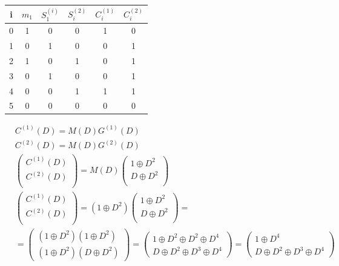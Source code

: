 \documentclass[12pt]{article}
\begin{document}
    \begin{table}[h]
       \centering 
        \begin{tabular}{cccccc}
            i & $m_1$ & $S_1^{(i)}$ & $S_i^{(2)}$ & $C_i^{(1)}$ & $C_i^{(2)}$  \\ \hline
            0 &  1    &  0          &   0         &  1          &  0  \\        
            1 &  0    &  1          &   0         &  0          &  1  \\  
            2 &  1    &  0          &   1         &  0          &  1  \\  
            3 &  0    &  1          &   0         &  0          &  1  \\  
            4 &  0    &  0          &   1         &  1          &  1  \\  
            5 &  0    &  0          &   0         &  0          &  0  \\   
        \end{tabular}
    \end{table}

    \begin{align*}
        & C^{(1)}(D) = M(D)G^{(1)}(D) \\ 
        & C^{(2)}(D) = M(D)G^{(2)}(D) \\ 
        & \begin{pmatrix}
            C^{(1)}(D) \\
            C^{(2)}(D) \\
        \end{pmatrix} = 
        M(D)\begin{pmatrix}
            1 \oplus D^2 \\
            D \oplus D^2 \\
        \end{pmatrix} \\
        & \begin{pmatrix}
            C^{(1)}(D) \\
            C^{(2)}(D) \\
        \end{pmatrix} =
        (1 \oplus D^2)
        \begin{pmatrix}
        1\oplus D^2 \\  
        D \oplus D^2 \\ 
        \end{pmatrix}=\\   
        & = \begin{pmatrix}
            (1\oplus D^2)(1\oplus D^2) \\
            (1 \oplus D^2)(D \oplus D^2) 
        \end{pmatrix} = 
        \begin{pmatrix}
            1\oplus D^2 \oplus D^2 \oplus D^4 \\
            D \oplus D^2 \oplus D^3 \oplus D^4
        \end{pmatrix} = 
        \begin{pmatrix}
            1 \oplus D^4 \\
            D \oplus D^2 \oplus D^3 \oplus D^4
        \end{pmatrix}
    \end{align*}
    
\end{document}

